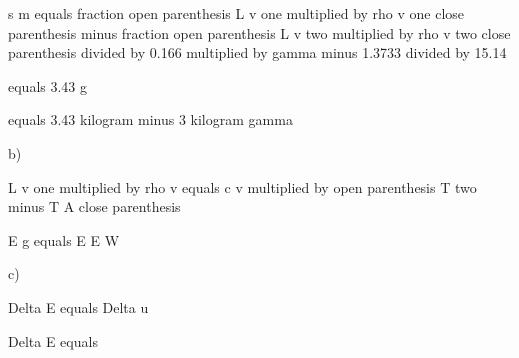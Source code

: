 s m equals fraction open parenthesis L v one multiplied by rho v one close parenthesis minus fraction open parenthesis L v two multiplied by rho v two close parenthesis divided by 0.166 multiplied by gamma minus 1.3733 divided by 15.14

equals 3.43 g

equals 3.43 kilogram minus 3 kilogram gamma

b)

L v one multiplied by rho v equals c v multiplied by open parenthesis T two minus T A close parenthesis

E g equals E E W

c)

Delta E equals Delta u

Delta E equals